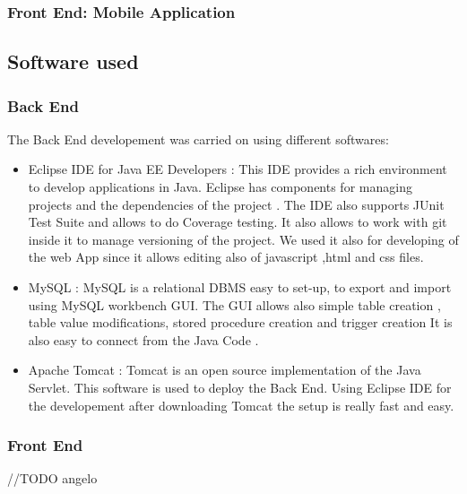 \subsubsection{Front End: Mobile Application}

\subsection{Software used}
\subsubsection{Back End}
The Back End developement was carried on using different softwares:
\begin{itemize}
\item Eclipse IDE for Java EE Developers :  This IDE provides a rich environment to develop applications in Java. Eclipse has components for managing projects and the dependencies of the project . The IDE also supports JUnit Test Suite and allows to do Coverage testing.
It also allows to work with git inside it to manage versioning of the project.
We used it also for developing of the web App since it allows editing also of javascript ,html and css files.
\item MySQL : MySQL is a relational DBMS easy to set-up, to export and import using MySQL workbench GUI.
				The GUI allows also simple table creation , table value modifications, stored procedure creation and trigger creation
				It is also easy to connect from the Java Code .
\item Apache Tomcat : Tomcat  is an open source implementation of the Java Servlet. This software is used to deploy the Back End.
						Using Eclipse IDE for the developement after downloading Tomcat the setup is really fast and easy.
\end{itemize}\subsubsection{Front End}
//TODO angelo


